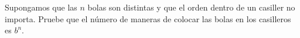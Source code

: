 \begin{statement}{1}
  Supongamos que las $n$ bolas son distintas y que el orden dentro de un casiller no importa.
  Pruebe que el n\'umero de maneras de colocar las bolas en los casilleros es $b^n$.
\end{statement}